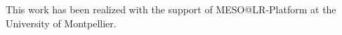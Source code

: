 \documentclass[amt, article]{copernicus}
\begin{document}


\begin{acknowledgements}
This work has been realized with the support of MESO@LR-Platform at the University of Montpellier.
\end{acknowledgements}












\appendixfigures  %

\appendixtables   %

\end{document}
